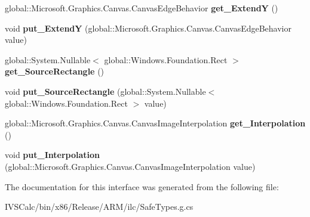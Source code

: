 \begin{DoxyCompactItemize}
global\+::\+Microsoft.\+Graphics.\+Canvas.\+Canvas\+Edge\+Behavior {\bfseries get\+\_\+\+ExtendY} ()
\item 
\mbox{\label{interface_microsoft_1_1_graphics_1_1_canvas_1_1_brushes_1_1_i_canvas_image_brush_a02ac0206445780a5997e968f76eeb0f0}} 
void {\bfseries put\+\_\+\+ExtendY} (global\+::\+Microsoft.\+Graphics.\+Canvas.\+Canvas\+Edge\+Behavior value)
\item 
\mbox{\label{interface_microsoft_1_1_graphics_1_1_canvas_1_1_brushes_1_1_i_canvas_image_brush_abd99fb761de06f6a5a4446147e3b0dee}} 
global\+::\+System.\+Nullable$<$ global\+::\+Windows.\+Foundation.\+Rect $>$ {\bfseries get\+\_\+\+Source\+Rectangle} ()
\item 
\mbox{\label{interface_microsoft_1_1_graphics_1_1_canvas_1_1_brushes_1_1_i_canvas_image_brush_a18db26edd67cb06b7b78f0e7709c8806}} 
void {\bfseries put\+\_\+\+Source\+Rectangle} (global\+::\+System.\+Nullable$<$ global\+::\+Windows.\+Foundation.\+Rect $>$ value)
\item 
\mbox{\label{interface_microsoft_1_1_graphics_1_1_canvas_1_1_brushes_1_1_i_canvas_image_brush_aebd2633bbc018c5fc49fd70e6a24fed8}} 
global\+::\+Microsoft.\+Graphics.\+Canvas.\+Canvas\+Image\+Interpolation {\bfseries get\+\_\+\+Interpolation} ()
\item 
\mbox{\label{interface_microsoft_1_1_graphics_1_1_canvas_1_1_brushes_1_1_i_canvas_image_brush_a149e4d24e65f75b3f58f3a71d893bcd4}} 
void {\bfseries put\+\_\+\+Interpolation} (global\+::\+Microsoft.\+Graphics.\+Canvas.\+Canvas\+Image\+Interpolation value)
\end{DoxyCompactItemize}


The documentation for this interface was generated from the following file\+:\begin{DoxyCompactItemize}
\item 
I\+V\+S\+Calc/bin/x86/\+Release/\+A\+R\+M/ilc/Safe\+Types.\+g.\+cs\end{DoxyCompactItemize}
